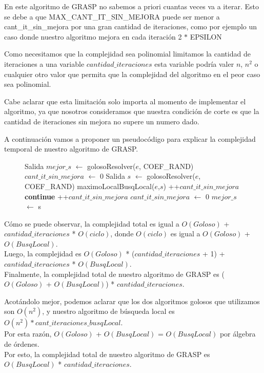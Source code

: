 En este algoritmo de GRASP no sabemos a priori cuantas veces va a iterar. Esto se debe a que MAX\_CANT\_IT\_SIN\_MEJORA puede ser menor a cant\_it\_sin\_mejora por una gran cantidad de iteraciones, como por ejemplo un caso donde nuestro algoritmo mejora en cada iteración 2 $*$ EPSILON

Como necesitamos que la complejidad sea polinomial limitamos la cantidad de iteraciones a una variable $cantidad\_iteraciones$ esta variable podría valer $n$, $n^2$ o cualquier otro valor que permita que la complejidad del algoritmo en el peor caso sea polinomial.

Cabe aclarar que esta limitación solo importa al momento de implementar el algoritmo, ya que nosotros consideramos que nuestra condición de corte es que la cantidad de iteraciones sin mejora no supere un numero dado.

A continuación vamos a proponer un pseudocódigo para explicar la complejidad temporal de nuestro algoritmo de GRASP.

\begin{center}
 \begin{figure}[H]
  \begin{pseudo}
    \State Salida $mejor\_s$ $\leftarrow$ golosoResolver($e$, COEF\_RAND) 
    \State $cant\_it\_sin\_mejora$ $\leftarrow$ 0 
     
      \State Salida $s$ $\leftarrow$ golosoResolver($e$, COEF\_RAND) 
      \State maximoLocalBusqLocal($e$,$s$) 
       
	\State++$cant\_it\_sin\_mejora$ 
	\State \textbf{continue}
      \EndIf
       
	\State ++$cant\_it\_sin\_mejora$ 
      \Else
	\State $cant\_it\_sin\_mejora$ $\leftarrow$ 0 
      \EndIf
       
	\State $mejor\_s$ $\leftarrow$ s 
      \EndIf
    \EndWhile
    \EndProcedure
  \end{pseudo}
 \end{figure}
\end{center}

Cómo se puede observar, la complejidad total es igual a $O(Goloso)$ + $cantidad\_iteraciones$ * $O(ciclo)$, donde $O(ciclo)$ es igual a  $O(Goloso)$ + $O(BusqLocal)$.\\
Luego, la complejidad es $O(Goloso)$ * ($cantidad\_iteraciones$ + 1) + $cantidad\_iteraciones$ * $O(BusqLocal)$.\\
Finalmente, la complejidad total de nuestro algoritmo de GRASP es ($O(Goloso)$ + $O(BusqLocal)$) * $cantidad\_iteraciones$.

Acotándolo mejor, podemos aclarar que los dos algoritmos golosos que utilizamos son $O(n^2)$, y nuestro algoritmo de búsqueda local es $O(n^2) * cant\_iteraciones\_busqLocal$.\\
Por esta razón, $O(Goloso)$ + $O(BusqLocal)$ = $O(BusqLocal)$ por álgebra de órdenes.\\
Por esto, la complejidad total de nuestro algoritmo de GRASP es $O(BusqLocal)$ * $cantidad\_iteraciones$.